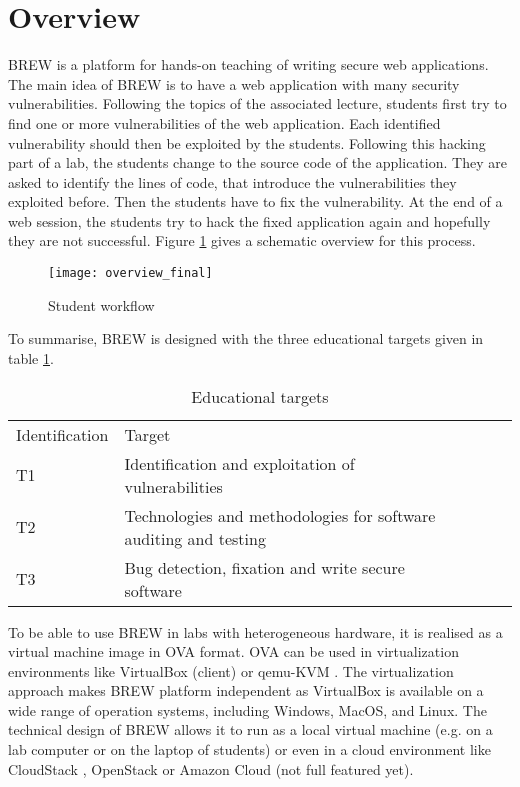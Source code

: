 \documentclass{llncs}
\begin{document}
\section{Overview}
BREW is a platform for hands-on teaching of writing secure web applications.
The main idea of BREW is to have a web application with many security vulnerabilities.
Following the topics of the associated lecture, students first try to find one or more vulnerabilities of the web application.
Each identified vulnerability should then be exploited by the students.
Following this hacking part of a lab, the students change to the source code of the application.
They are asked to identify the lines of code, that introduce the vulnerabilities they exploited before.
Then the students have to fix the vulnerability.
At the end of a web session, the students try to hack the fixed application again and hopefully they are not successful.
Figure \ref{fig:overview} gives a schematic overview for this process.

\begin{figure}[h!]
\centering
\texttt{[image: overview\_final]}
\caption{Student workflow} 
\label{fig:overview}
\end{figure}

To summarise, BREW is designed with the three educational targets given in table \ref{tab:edtarget}.

\begin{table}
\centering
\caption{Educational targets}
\label{tab:edtarget}
\begin{tabular}{llllll}
\hline\noalign{\smallskip}
Identification & Target\\
\noalign{\smallskip}
\hline
\noalign{\smallskip}
T1 & Identification and exploitation of vulnerabilities\\
T2 & Technologies and methodologies for software auditing and testing\\
T3 & Bug detection, fixation and write secure software\\
\hline
\end{tabular}
\end{table} 

To be able to use BREW in labs with heterogeneous hardware, it is realised as a virtual machine image in OVA format. OVA can be used in virtualization environments like VirtualBox \cite{vbox2014} (client) or qemu-KVM \cite{kvm2014}. The virtualization approach makes BREW platform independent as VirtualBox is available on a wide range of operation systems, including Windows, MacOS, and Linux. The technical design of BREW allows it to run as a local virtual machine (e.g. on a lab computer or on the laptop of students) or even in a cloud environment like CloudStack \cite{cloudstack2014}, OpenStack \cite{openstack2014} or Amazon Cloud \cite{amazon2014} (not full featured yet).
\end{document}
